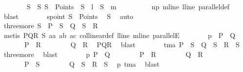 \begin{isabellebody}
\isanewline
\ \ \ \ \ \ \isamarkupfalse%
\ S\ \ S{\isacharcolon}{\kern0pt}\ {\isachardoublequoteopen}S\ {\isasymin}\ Points\ {\isasymand}\ S\ {\isasymlhd}\ {\isacharquery}{\kern0pt}l\ {\isasymand}\ S\ {\isasymlhd}\ {\isacharquery}{\kern0pt}m{\isachardoublequoteclose}\isanewline
\ \ \ \ \ \ \ \ \isamarkupfalse%
\ np\ mline\ lline\ parallel{\isacharunderscore}{\kern0pt}def\ \isamarkupfalse%
\ blast\isanewline
\ \ \ \ \ \ \isamarkupfalse%
\ spoint{\isacharcolon}{\kern0pt}\ {\isachardoublequoteopen}S\ {\isasymin}\ Points{\isachardoublequoteclose}\ \isamarkupfalse%
\ S\ \isamarkupfalse%
\ auto\ \isanewline
\ \ \ \ \ \ \isamarkupfalse%
\ three{\isacharunderscore}{\kern0pt}more{\isacharcolon}{\kern0pt}\ {\isachardoublequoteopen}S\ {\isasymnoteq}\ P\ {\isasymand}\ S\ {\isasymnoteq}\ Q\ {\isasymand}\ S\ {\isasymnoteq}\ R{\isachardoublequoteclose}\isanewline
\ \ \ \ \ \ \ \ \isamarkupfalse%
\ {\isacharparenleft}{\kern0pt}metis\ PQR\ S\ a{}a\ a{}b\ a{}c\ collinear{\isacharunderscore}{\kern0pt}def\ lline\ mline\ parallelE{\isacharparenright}{\kern0pt}\isanewline
\ \ \ \ \ \ \isamarkupfalse%
\ p{}{\isacharcolon}{\kern0pt}\ {\isachardoublequoteopen}\ P\ {\isasymnoteq}\ Q\ {\isasymand}\isanewline
\ \ \ \ \ \ \ P\ {\isasymnoteq}\ R\ {\isasymand}\isanewline
\ \ \ \ \ \ \ Q\ {\isasymnoteq}\ R{\isachardoublequoteclose}\ \isamarkupfalse%
\ PQR\ \isamarkupfalse%
\ blast\isanewline
\ \ \ \ \ \ \isamarkupfalse%
\ tma{\isacharcolon}{\kern0pt}\ {\isachardoublequoteopen}P\ {\isasymnoteq}\ S\ {\isasymand}\ Q\ {\isasymnoteq}\ S\ {\isasymand}\ R\ {\isasymnoteq}\ S{\isachardoublequoteclose}\ \isamarkupfalse%
\ three{\isacharunderscore}{\kern0pt}more\ \isamarkupfalse%
\ blast\isanewline
\ \ \ \ \ \ \isamarkupfalse%
\ p{}{\isacharcolon}{\kern0pt}\ {\isachardoublequoteopen}P\ {\isasymnoteq}\ Q\ {\isasymand}\isanewline
\ \ \ \ \ \ \ P\ {\isasymnoteq}\ R\ {\isasymand}\isanewline
\ \ \ \ \ \ \ Q\ {\isasymnoteq}\ R\ {\isasymand}\isanewline
\ \ \ \ \ \ \ P\ {\isasymnoteq}\ S\ {\isasymand}\isanewline
\ \ \ \ \ \ \ Q\ {\isasymnoteq}\ S\ {\isasymand}\ R\ {\isasymnoteq}\ S{\isachardoublequoteclose}\ \isamarkupfalse%
\ p{}\ tma\ \isamarkupfalse%
\ blast\isanewline
\ \ \ \ \ \ \isamarkupfalse%

\end{isabellebody}
